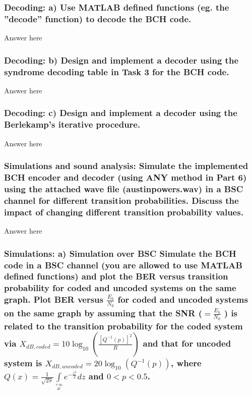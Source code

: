 \documentclass[a4paper]{report}
\begin{document}
\subsubsection*{Decoding: a) Use MATLAB defined functions (eg. the ”decode” function) to decode the BCH code.}

Answer here \\

\subsubsection*{Decoding: b) Design and implement a decoder using the syndrome decoding table in Task 3 for the BCH code.}

Answer here \\

\subsubsection*{Decoding: c) Design and implement a decoder using the Berlekamp’s iterative procedure.}

Answer here \\

\subsubsection*{Simulations and sound analysis: Simulate the implemented BCH encoder and decoder (using ANY method in Part 6) using the attached wave file (austinpowers.wav) in a BSC channel for different transition probabilities. Discuss the impact of changing different transition probability values.}

Answer here \\

\subsubsection*{Simulations: a) Simulation over BSC Simulate the BCH code in a BSC channel (you are allowed to use MATLAB defined functions) and plot the BER versus transition probability for coded and uncoded systems on the same graph. Plot BER versus $\frac{E_b}{N_0}$ for coded and uncoded systems on the same graph by assuming that the SNR ($ = \frac{E_b}{N_0}$ ) is related to the transition probability for the coded system via $X_{dB,coded} = 10 \log_{10}(\frac{[Q^{−1} (p)]^2}{R}) $ and that for uncoded system is $X_{dB,uncoded} = 20\log_{10}(Q^{−1} (p)) $, where $Q(x) = \frac{1}{\sqrt{2 \pi}} \int\limits_{x}\limits^{+\infty} e^{ -\frac{z^2}{2}} dz $ and $0 < p < 0.5$.}
\end{document}
